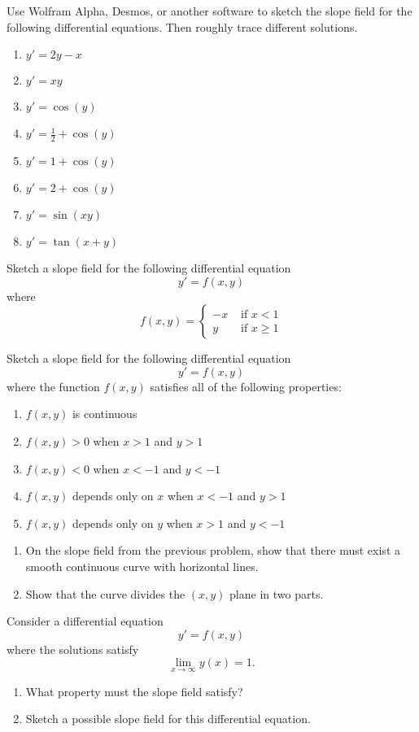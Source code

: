 \begin{exercises}
	\begin{problist}
	\prob Use Wolfram Alpha, Desmos, or another software to sketch the slope field for the following differential equations. Then roughly trace different solutions.
	\begin{enumerate}
		\item $y'=2y-x$
		\item $y'=xy$
		\item $y'=\cos(y)$
		\item $y'=\frac12+\cos(y)$
		\item $y'=1+\cos(y)$
		\item $y'=2+\cos(y)$
		\item $y'=\sin(xy)$
		\item $y'=\tan(x+y)$
	\end{enumerate}
	
	\prob Sketch a slope field for the following differential equation
	$$ y'=f(x,y)$$
	where 
	$$
	f(x,y) = \begin{cases}
 		-x & \text{ if } x< 1 \\
 		y & \text{ if } x \geq 1		
	\end{cases}
	$$

	\prob Sketch a slope field for the following differential equation
	$$ y'=f(x,y)$$
	where the function $f(x,y)$ satisfies all of the following properties:
	\begin{enumerate}
		\item $f(x,y)$ is continuous
		\item $f(x,y) > 0$ when $x>1$ and $y>1$
		\item $f(x,y) < 0$ when $x<-1$ and $y<-1$
		\item $f(x,y)$ depends only on $x$ when $x<-1$ and $y>1$
		\item $f(x,y)$ depends only on $y$ when $x>1$ and $y<-1$
	\end{enumerate}
	
	
	\prob 
		\begin{enumerate}
			\item On the slope field from the previous problem, show that there must exist a smooth continuous curve with horizontal lines.

			\item Show that the curve divides the $(x,y)$ plane in two parts.

		\end{enumerate}
	
	


	\prob Consider a differential equation 
	$$ y'=f(x,y)$$
	where the solutions satisfy
	$$ \lim_{x\to \infty} y(x) = 1.$$

	\begin{enumerate}
		\item What property must the slope field satisfy?

		\item Sketch a possible slope field for this differential equation.
	\end{enumerate}
	
	\end{problist}
\end{exercises}
